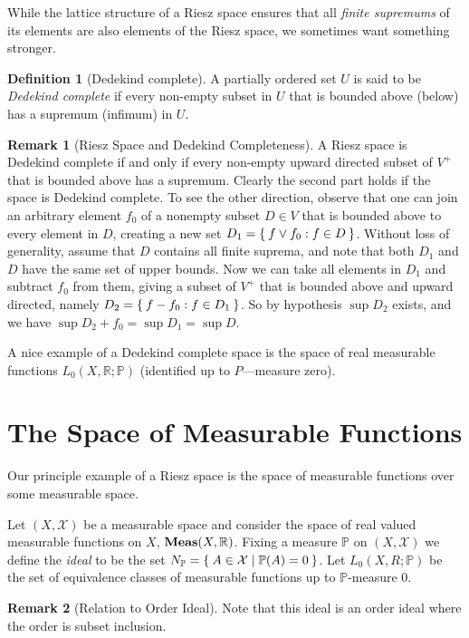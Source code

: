 \documentclass[letterpaper,10pt,oneside,onecolumn,reqno]{amsart}
\renewcommand{\P}{\mathbb P}
\newcommand{\R}{\mathbb R}
\newcommand{\X}{\mathcal X}
\theoremstyle{definition}
\newtheorem{defn}{Definition}
\newtheorem{rem}{Remark}
\newcommand{\catname}[1]{{\normalfont\textbf{#1}}}
\newcommand{\Meas}{\catname{Meas}}
\newcommand{\join}{\vee}
\begin{document}
While the lattice structure of a Riesz space ensures that all
\emph{finite supremums} of its elements are also elements of the Riesz
space, we sometimes want something stronger. 

\begin{defn}[Dedekind complete]\label{def:12}
  A partially ordered set $U$ is said to be \emph{Dedekind complete} if every non-empty subset in $U$
  that is bounded above (below) has a supremum (infimum) in $U$.
\end{defn}

\begin{rem}[Riesz Space and Dedekind Completeness]\label{rem:4}
  A Riesz space is Dedekind complete if and only if every non-empty
  upward directed subset of $V^+$ that is bounded above has a
  supremum. Clearly the second part holds if the space is Dedekind
  complete. To see the other direction, observe that one can join an
  arbitrary element $f_0$ of a nonempty subset $D \in V$ that is
  bounded above to every element in $D$, creating a new set $D_1 =
  \Set{f \join f_0 : f \in D}$. Without loss of generality, assume
  that $D$ contains all finite suprema, and note that both $D_1$ and
  $D$ have the same set of upper bounds. Now we can take all elements
  in $D_1$ and subtract $f_0$ from them, giving a subset of $V^+$ that
  is bounded above and upward directed, namely $D_2 = \Set{f-f_0 : f
    \in D_1}$. So by hypothesis $\sup{D_2}$ exists, and we have
  $\sup{D_2} + f_0=\sup{D_1}=\sup{D}$.
\end{rem}


A nice example of a Dedekind complete space is the space of real
measurable functions $L_0(X,\R;\P)$ (identified up to $P$---measure
zero).

\part{The Space of Measurable Functions}

Our principle example of a Riesz space is the space of measurable
functions over some measurable space.

Let $(X, \X)$ be a measurable space and consider the space of real
valued measurable functions on $X$, $\Meas(X,\R)$. Fixing a measure
$\P$ on $(X, \X)$ we define the \emph{ideal} to be the
set $N_\P = \Set{A \in \X | \P(A) = 0}$. Let $L_0(X,R;\P)$ be the set
of equivalence classes of measurable functions up to $\P$-measure 0.

\begin{rem}[Relation to Order Ideal]\label{rem:5}
  Note that this ideal is an order ideal where the order is subset
  inclusion.
\end{rem}
\end{document}
